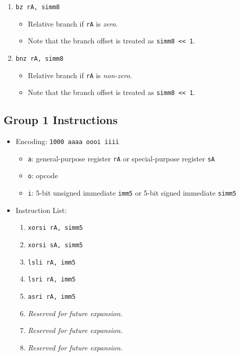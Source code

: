 \documentclass{article}
\begin{document}
\begin{itemize}
\begin{enumerate}
			\item \texttt{bz rA, simm8}
				\begin{itemize}
				\item Relative branch if \texttt{rA} is \textit{zero}.
				\item Note that the branch offset is treated as
					\texttt{simm8 << 1}.
				\end{itemize}
			\item \texttt{bnz rA, simm8}
				\begin{itemize}
				\item Relative branch if \texttt{rA} is \textit{non-zero}.
				\item Note that the branch offset is treated as
					\texttt{simm8 << 1}.
				\end{itemize}
			\end{enumerate}
		\end{itemize}

	\subsection{Group 1 Instructions}
		\begin{itemize}
		\item Encoding:  \texttt{1000 aaaa oooi iiii}
			\begin{itemize}
			\item \texttt{a}:  general-purpose register \texttt{rA} or
				special-purpose register \texttt{sA}
			\item \texttt{o}:  opcode
			\item \texttt{i}:  5-bit unsigned immediate \texttt{imm5} or
				5-bit signed immediate \texttt{simm5}
			\end{itemize}
		\item Instruction List:
			\begin{enumerate}
			\item \texttt{xorsi rA, simm5}
			\item \texttt{xorsi sA, simm5}
			\item \texttt{lsli rA, imm5}
			\item \texttt{lsri rA, imm5}

			\item \texttt{asri rA, imm5}
			\item \textit{Reserved for future expansion.}
			\item \textit{Reserved for future expansion.}
			\item \textit{Reserved for future expansion.}
			\end{enumerate}
		\end{itemize}
\end{document}
